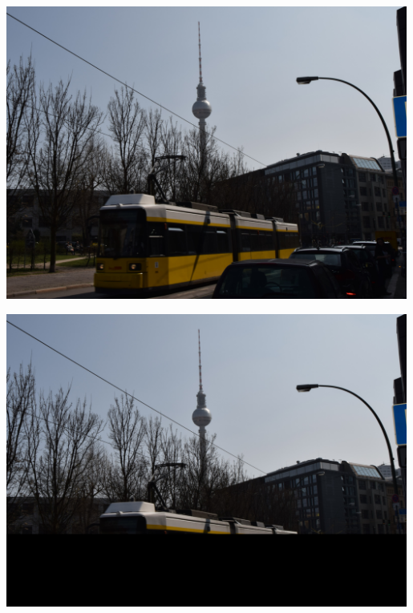 \begin{frame}
\begin{center}
{\begin{minipage}{.8\textwidth}
\begin{minipage}{0.33\textwidth}
	\begin{center}
		\includegraphics[width=0.99\textwidth]{img/tram}%
	\end{center}
\end{minipage}
\hfill
\begin{minipage}{0.33\textwidth}
	\begin{center}
		\includegraphics[width=0.99\textwidth]{img/tram_missing}%
	\end{center}
\end{minipage}
\end{minipage}
}



\end{center}

\end{frame}

